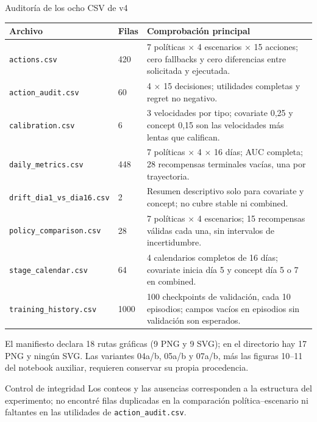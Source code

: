\documentclass[aspectratio=169,10pt]{beamer}
\begin{document}
\begin{frame}{Auditoría de los ocho CSV de v4}
\scriptsize
\begin{tabular}{p{}p{}p{}}
\toprule
\textbf{Archivo} & \textbf{Filas} & \textbf{Comprobación principal} \\
\midrule
\texttt{actions.csv} & 420 & 7 políticas \(\times\) 4 escenarios \(\times\) 15 acciones; cero fallbacks y cero diferencias entre solicitada y ejecutada. \\
\texttt{action\_audit.csv} & 60 & 4 \(\times\) 15 decisiones; utilidades completas y regret no negativo. \\
\texttt{calibration.csv} & 6 & 3 velocidades por tipo; covariate 0,25 y concept 0,15 son las velocidades más lentas que califican. \\
\texttt{daily\_metrics.csv} & 448 & 7 políticas \(\times\) 4 \(\times\) 16 días; AUC completa; 28 recompensas terminales vacías, una por trayectoria. \\
\texttt{drift\_dia1\_vs\_dia16.csv} & 2 & Resumen descriptivo solo para covariate y concept; no cubre stable ni combined. \\
\texttt{policy\_comparison.csv} & 28 & 7 políticas \(\times\) 4 escenarios; 15 recompensas válidas cada una, sin intervalos de incertidumbre. \\
\texttt{stage\_calendar.csv} & 64 & 4 calendarios completos de 16 días; covariate inicia día 5 y concept día 5 o 7 en combined. \\
\texttt{training\_history.csv} & 1000 & 100 checkpoints de validación, cada 10 episodios; campos vacíos en episodios sin validación son esperados. \\
\bottomrule
\end{tabular}
\vspace{0.2em}
{\tiny El manifiesto declara 18 rutas gráficas (9 PNG y 9 SVG); en el directorio
hay 17 PNG y ningún SVG. Las variantes 04a/b, 05a/b y 07a/b, más las figuras
10--11 del notebook auxiliar, requieren conservar su propia procedencia.}
\vspace{0.35em}
\begin{block}{Control de integridad}
Los conteos y las ausencias corresponden a la estructura del experimento; no
encontré filas duplicadas en la comparación política--escenario ni faltantes
en las utilidades de \texttt{action\_audit.csv}.
\end{block}
\end{frame}
\end{document}
